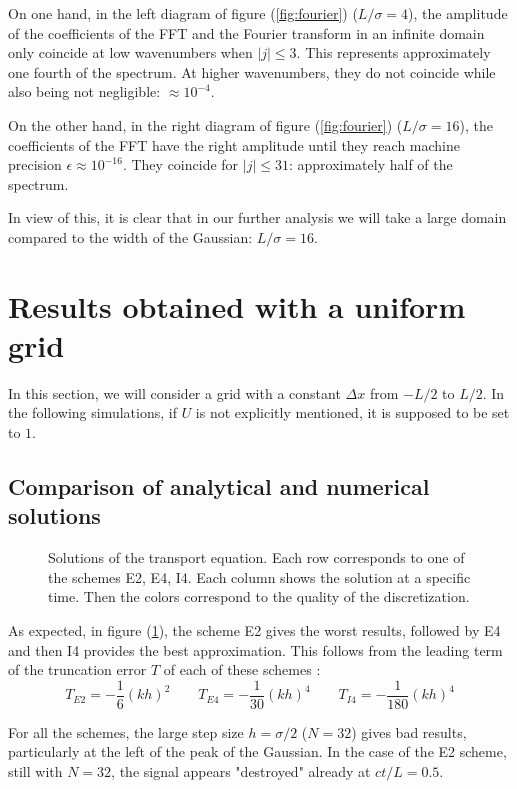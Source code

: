\documentclass[11 pt]{article}
\begin{document}
On one hand, in the left diagram of figure (\ref{fig:fourier}) ($L / \sigma = 4$), the amplitude of the coefficients of the FFT and the Fourier transform in an infinite domain only coincide at low wavenumbers when $|j| \leq 3$. This represents approximately one fourth of the spectrum. At higher wavenumbers, they do not coincide while also being not negligible: $\approx 10^{-4}$.

On the other hand, in the right diagram of figure (\ref{fig:fourier}) ($L/\sigma = 16$), the coefficients of the FFT have the right amplitude until they reach machine precision $\epsilon \approx 10^{-16}$. They coincide for $|j| \leq 31$: approximately half of the spectrum.

In view of this, it is clear that in our further analysis we will take a large domain compared to the width of the Gaussian: $L / \sigma = 16$.


\section{Results obtained with a uniform grid}
In this section, we will consider a grid with a constant $\Delta x$ from $-L/2$ to $L/2$. In the following simulations, if $U$ is not explicitly mentioned, it is supposed to be set to $1$.

\subsection{Comparison of analytical and numerical solutions}

\begin{figure}[H]
    \centering
    
    \caption{Solutions of the transport equation. Each row corresponds to one of the schemes E2, E4, I4. Each column shows the solution at a specific time. Then the colors correspond to the quality of the discretization.}
    \label{fig:overview}
\end{figure}

As expected, in figure (\ref{fig:overview}), the scheme E2 gives the worst results, followed by E4 and then I4 provides the best approximation. This follows from the leading term of the truncation error $T$ of each of these schemes \cite[p. 5]{slides}:
\[T_{E2}=-\frac{1}{6}(kh)^2 \qquad T_{E4} = -\frac{1}{30}(kh)^4 \qquad T_{I4}=-\frac{1}{180}(kh)^4\]

For all the schemes, the large step size $h=\sigma/2$ ($N=32$) gives bad results, particularly at the left of the peak of the Gaussian. In the case of the E2 scheme, still with $N=32$, the signal appears "destroyed" already at $ct/L=0.5$.
\end{document}

